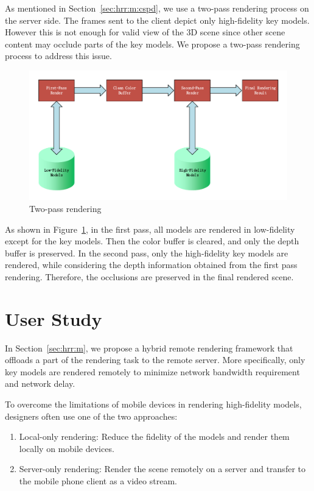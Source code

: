 As mentioned in Section~\ref{sec:hrr:m:cspd}, we use a two-pass rendering process on the server side.
The frames sent to the client depict only high-fidelity key models.
However this is not enough for valid view of the 3D scene since other scene content may occlude parts of the key models.
We propose a two-pass rendering process to address this issue.

\begin{figure}[!htbp]
	\includegraphics[width=\textwidth]{figures/two-pass-rendering.pdf}
	\caption{Two-pass rendering}
	\label{fig:tp-rendering}
\end{figure}

As shown in Figure~\ref{fig:tp-rendering}, in the first pass, all models are rendered in low-fidelity except for the key models. Then the color buffer is cleared, and only the depth buffer is preserved. In the second pass, only the high-fidelity key models are rendered, while considering the depth information obtained from the first pass rendering. Therefore, the occlusions are preserved in the final rendered scene.

\section{User Study}
\label{sec:hrr:us}

In Section~\ref{sec:hrr:m}, we propose a hybrid remote rendering framework that offloads a part of the rendering task to the remote server. More specifically, only key models are rendered remotely to minimize network bandwidth requirement and network delay.

To overcome the limitations of mobile devices in rendering high-fidelity models, designers often use one of the two approaches:
\begin{enumerate}
\item
Local-only rendering: Reduce the fidelity of the models and render them locally on mobile devices.
\item
Server-only rendering: Render the scene remotely on a server and transfer to the mobile phone client as a video stream.
\end{enumerate}

